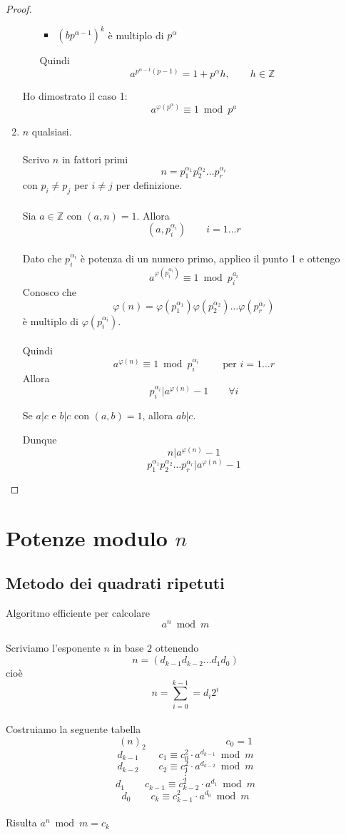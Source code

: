 \documentclass[a4paper,12pt, oneside]{book}
\begin{document}
\begin{teorema}
\begin{proof}
\begin{enumerate}
\begin{enumerate}[label=\Roman*) ]
\begin{itemize}
										\item $(b p^{\alpha-1})^k$ è multiplo di $p^\alpha$
									\end{itemize}
									Quindi
									$$a^{p^{\alpha-1} (p-1)} = 1+p^\alpha h, \qquad h \in \mathbb{Z}$$									
							\end{enumerate}
							Ho dimostrato il caso 1: $$a^{\varphi(p^\alpha)} \equiv 1 \bmod p^a$$
						\item $n$ qualsiasi.\\\\
							Scrivo $n$ in fattori primi
							$$n = p_1^{\alpha_1} p_2^{\alpha_2} \dots p_r^{\alpha_r}$$
							con $p_i \not= p_j$ per $i \not= j$ per definizione.\\\\
							Sia $a \in \mathbb{Z}$ con $(a,n)=1$.
							Allora $$(a, p_i^{\alpha_i}) \qquad i=1 \dots r$$\\
							Dato che $p_i^{\alpha_i}$ è potenza di un numero primo, applico il punto 1 e ottengo
							$$a^{\varphi(p_i^{\alpha_i})} \equiv 1 \bmod p_i^{a_i}$$
							Conosco che
							$$\varphi(n) = \varphi(p_1^{\alpha_1}) \varphi(p_2^{\alpha_2}) \dots \varphi(p_r^{\alpha_r})$$
							è multiplo di $\varphi(p_i^{\alpha_i})$.\\\\
							Quindi 
							$$a^{\varphi(n)} \equiv 1 \bmod p_i^{\alpha_i} \qquad \mbox{ per } i = 1 \dots r$$
							Allora
							$$p_i^{\alpha_i} | a^{\varphi(n)}-1 \qquad \forall i$$
							\begin{nota}
								Se $a|c$ e $b|c$ con $(a,b)=1$, allora $ab|c$.
							\end{nota}
							Dunque
							$$n | a^{\varphi(n)} -1$$
							$$p_1^{\alpha_1} p_2^{\alpha_2} \dots p_r^{\alpha_r} | a^{\varphi(n)} -1$$
					\end{enumerate}
				\end{proof}	
			\end{teorema}


\chapter{Potenze modulo $n$}
	\section{Metodo dei quadrati ripetuti}
	Algoritmo efficiente per calcolare $$a^n \bmod m$$\\
	Scriviamo l'esponente $n$ in base $2$
	ottenendo $$n=(d_{k-1} d_{k-2} \dots d_1 d_0)$$
	cioè $$n = \sum_{i=0}^{k-1} = d_i 2^i$$\\
	Costruiamo la seguente tabella
	$$(n)_2 \qquad \qquad \qquad \qquad c_0 = 1$$
	$$d_{k-1} \qquad c_1 \equiv c_{0}^{2} \cdot a^{d_{k-1}} \bmod m$$
	$$d_{k-2} \qquad c_2 \equiv c_{1}^{2} \cdot a^{d_{k-2}} \bmod m$$
	$$\vdots$$
	$$d_{1} \qquad c_{k-1} \equiv c_{k-2}^{2} \cdot a^{d_{1}} \bmod m$$
	$$d_{0} \qquad c_k \equiv c_{k-1}^{2} \cdot a^{d_{0}} \bmod m$$\\
	Risulta $a^n \bmod m = c_k$
	
\end{document}
